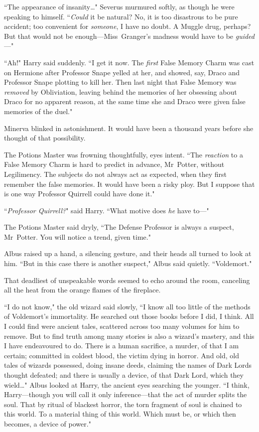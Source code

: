 ``The appearance of insanity{\ldots}" Severus murmured softly, as though he were speaking to himself. ``\emph{Could} it be natural? No, it is too disastrous to be pure accident; too convenient for \emph{someone}, I have no doubt. A Muggle drug, perhaps? But that would not be enough—Miss~Granger's madness would have to be \emph{guided}—"

``Ah!" Harry said suddenly. ``I get it now. The \emph{first} False Memory Charm was cast on Hermione after Professor Snape yelled at her, and showed, say, Draco and Professor Snape plotting to kill her. Then last night that False Memory was \emph{removed} by Obliviation, leaving behind the memories of her obsessing about Draco for no apparent reason, at the same time she and Draco were given false memories of the duel."

Minerva blinked in astonishment. It would have been a thousand years before she thought of that possibility.

The Potions Master was frowning thoughtfully, eyes intent. ``The \emph{reaction} to a False Memory Charm is hard to predict in advance, Mr~Potter, without Legilimency. The subjects do not always act as expected, when they first remember the false memories. It would have been a risky ploy. But I suppose that is one way Professor Quirrell could have done it."

``\emph{Professor Quirrell?}" said Harry. ``What motive does \emph{he} have to—"

The Potions Master said dryly, ``The Defense Professor is always a suspect, Mr~Potter. You will notice a trend, given time."

Albus raised up a hand, a silencing gesture, and their heads all turned to look at him. ``But in this case there is another suspect," Albus said quietly. ``Voldemort."

That deadliest of unspeakable words seemed to echo around the room, canceling all the heat from the orange flames of the fireplace.

``I do not know," the old wizard said slowly, ``I know all too little of the methods of Voldemort's immortality. He searched out those books before I did, I think. All I could find were ancient tales, scattered across too many volumes for him to remove. But to find truth among many stories is also a wizard's mastery, and this I have endeavoured to do. There is a human sacrifice, a murder, of that I am certain; committed in coldest blood, the victim dying in horror. And old, old tales of wizards possessed, doing insane deeds, claiming the names of Dark Lords thought defeated; and there is usually a device, of that Dark Lord, which they wield{\ldots}" Albus looked at Harry, the ancient eyes searching the younger. ``I think, Harry—though you will call it only inference—that the act of murder splits the soul. That by ritual of blackest horror, the torn fragment of soul is chained to this world. To a material thing of this world. Which must be, or which then becomes, a device of power."


